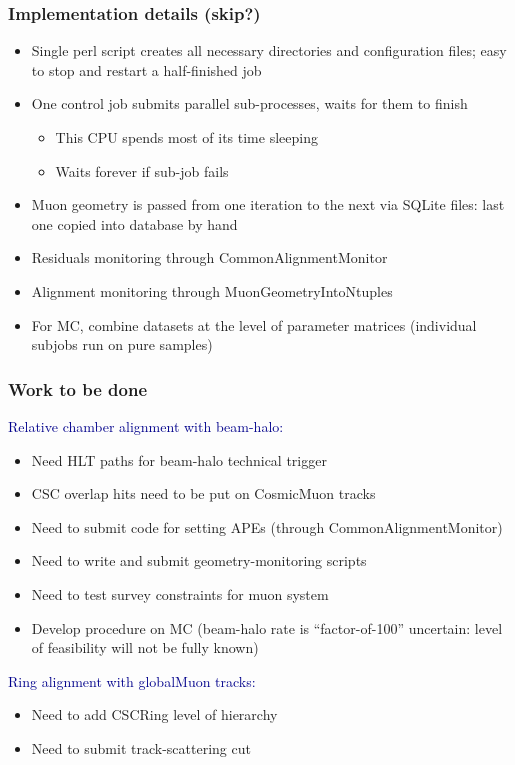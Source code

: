 \documentclass[compress]{beamer}
\begin{document}
\begin{frame}
\frametitle{Implementation details (skip?)}
\begin{itemize}\setlength{\itemsep}{0.3 cm}
\item Single perl script creates all necessary directories and
configuration files; easy to stop and restart a half-finished job
\item One control job submits parallel sub-processes, waits for them to finish
\begin{itemize}
\item This CPU spends most of its time sleeping
\item Waits forever if sub-job fails
\end{itemize}

\item Muon geometry is passed from one iteration to the next via
SQLite files: last one copied into database by hand

\item Residuals monitoring through CommonAlignmentMonitor

\item Alignment monitoring through MuonGeometryIntoNtuples

\item For MC, combine datasets at the level of parameter matrices
(individual subjobs run on pure samples)
\end{itemize}
\end{frame}

\begin{frame}
\frametitle{Work to be done}
\textcolor{darkblue}{Relative chamber alignment with beam-halo:}
\begin{itemize}\setlength{\itemsep}{0.2 cm}
\item Need HLT paths for beam-halo technical trigger
\item CSC overlap hits need to be put on CosmicMuon tracks
\item Need to submit code for setting APEs (through CommonAlignmentMonitor)
\item Need to write and submit geometry-monitoring scripts
\item Need to test survey constraints for muon system
\item Develop procedure on MC (beam-halo rate is ``factor-of-100''
uncertain: level of feasibility will not be fully known)
\end{itemize}

\vfill
\textcolor{darkblue}{Ring alignment with globalMuon tracks:}
\begin{itemize}\setlength{\itemsep}{0.2 cm}
\item Need to add CSCRing level of hierarchy
\item Need to submit track-scattering cut
\end{itemize}
\end{frame}
\end{document}
